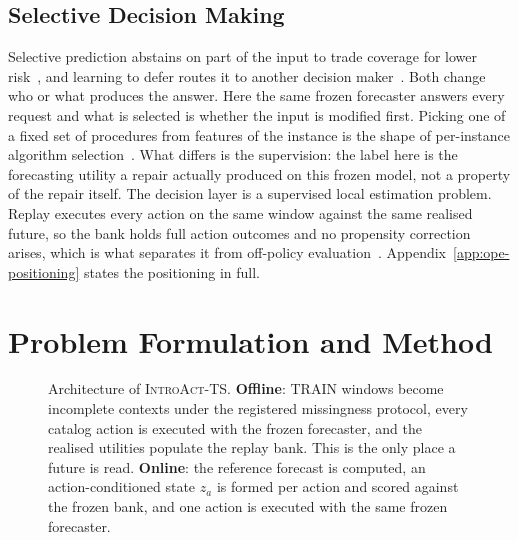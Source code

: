 \documentclass{article}
\newcommand{\figph}[3]{%
  \fbox{\parbox[c][#2][c]{#1}{\centering
    \textcolor{phgray}{\textsf{[\detokenize{#3}]}}}}}
\newcommand{\introact}{\textsc{IntroAct-TS}}
\begin{document}
\subsection{Selective Decision Making}
\label{sec:related-selective}
Selective prediction abstains on part of the input to trade coverage for lower
risk~\citep{chow1970optimum,vovk2005algorithmic,geifman2017selective,lei2018distribution}, and
learning to defer routes it to another decision maker~\citep{madras2018predict,
mozannar2020consistent}. Both change who or what produces the answer. Here the same frozen
forecaster answers every request and what is selected is whether the input is modified first.
Picking one of a fixed set of procedures from features of the instance is the shape of
per-instance algorithm selection~\citep{rice1976algorithm,xu2008satzilla}. What differs is the
supervision: the label here is the forecasting utility a repair actually produced on this
frozen model, not a property of the repair itself.
The decision layer is a supervised local estimation problem. Replay executes every action on
the same window against the same realised future, so the bank holds full action outcomes and no
propensity correction arises, which is what separates it from off-policy
evaluation~\citep{dudik2011doubly,swaminathan2015counterfactual}. Appendix~\ref{app:ope-positioning} states the positioning in
full.

\section{Problem Formulation and Method}
\label{sec:method}

\begin{figure}[t]
  \centering
  \figph{0.48\textwidth}{4.6cm}{FIGURE_2_ARCHITECTURE}
  \caption{Architecture of \introact{}. \textbf{Offline}: TRAIN windows become incomplete
  contexts under the registered missingness protocol, every catalog action is executed with the
  frozen forecaster, and the realised utilities populate the replay bank. This is the only place
  a future is read. \textbf{Online}: the reference forecast is computed, an action-conditioned
  state $z_a$ is formed per action and scored against the frozen bank, and one action is
  executed with the same frozen forecaster.}
  \label{fig:arch}
\end{figure}
\end{document}
